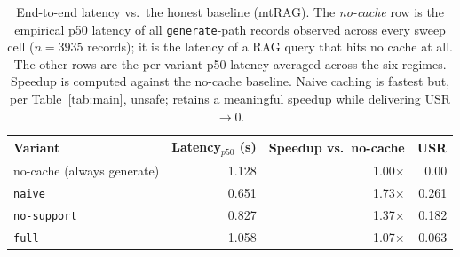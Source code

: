 \begin{table}[t]
\centering\small
\caption{End-to-end latency vs.\ the honest baseline (mtRAG). The \emph{no-cache} row is the empirical p50 latency of all \texttt{generate}-path records observed across every sweep cell ($n=3935$ records); it is the latency of a RAG query that hits no cache at all. The other rows are the per-variant p50 latency averaged across the six regimes. Speedup is computed against the no-cache baseline. Naive caching is fastest but, per Table~\ref{tab:main}, unsafe; \sys{} retains a meaningful speedup while delivering USR$\to$0.}
\label{tab:latency_vs_nocache}
\begin{tabular}{l rrr}
\toprule
Variant & Latency$_{p50}$ (s) & Speedup vs.\ no-cache & USR \\
\midrule
no-cache (always generate) & 1.128 & 1.00$\times$ & 0.00 \\
\texttt{naive} & 0.651 & 1.73$\times$ & 0.261 \\
\texttt{no-support} & 0.827 & 1.37$\times$ & 0.182 \\
\texttt{full} & 1.058 & 1.07$\times$ & 0.063 \\
\bottomrule
\end{tabular}
\end{table}
